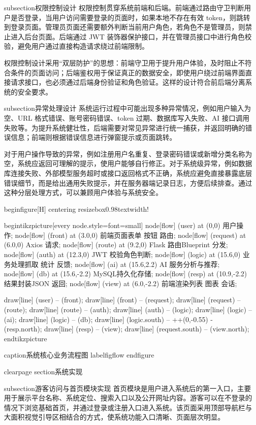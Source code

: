 subsection{权限控制设计}
权限控制贯穿系统前端和后端。前端通过路由守卫判断用户是否登录，当用户访问需要登录的页面时，如果本地不存在有效 token，则跳转到登录页面。管理员页面还需要额外判断当前用户角色，若角色不是管理员，则禁止进入后台页面。后端通过 JWT 装饰器保护接口，并在管理员接口中进行角色校验，避免用户通过直接构造请求绕过前端限制。

权限控制设计采用“双层防护”的思想：前端守卫用于提升用户体验，及时阻止不符合条件的页面访问；后端鉴权用于保证真正的数据安全，即使用户绕过前端界面直接请求接口，也必须通过后端身份验证和角色验证。这样的设计符合前后端分离系统的安全要求。

subsection{异常处理设计}
系统运行过程中可能出现多种异常情况，例如用户输入为空、URL 格式错误、账号密码错误、token 过期、数据库写入失败、AI 接口调用失败等。为提升系统健壮性，后端需要对常见异常进行统一捕获，并返回明确的错误信息；前端则根据错误信息进行弹窗提示或页面跳转。

对于用户操作导致的异常，例如注册用户名重复、登录密码错误或新增分类名称为空，系统应返回可理解的提示，使用户能够自行修正。对于系统级异常，例如数据库连接失败、外部模型服务超时或接口返回格式不正确，系统应避免直接暴露底层错误细节，而是给出通用失败提示，并在服务器端记录日志，方便后续排查。通过这种分层处理方式，可以兼顾用户体验与系统安全。

begin{figure}[H]
centering
resizebox{0.98textwidth}{!}{
begin{tikzpicture}[every node.style={font=small}]
  node[flow] (user) at (0,0) {用户操作};
  node[flow] (front) at (3.0,0) {前端页面表单  按钮  路由};
  node[flow] (request) at (6.0,0) {Axios 请求};
  node[flow] (route) at (9.2,0) {Flask 路由Blueprint 分发};
  node[flow] (auth) at (12.3,0) {JWT 校验角色判断};
  node[flow] (logic) at (15.6,0) {业务处理抓取  统计  反馈};
  node[flow] (ai) at (15.6,2.2) {AI 服务分析与推荐};
  node[flow] (db) at (15.6,-2.2) {MySQL持久化存储};
  node[flow] (resp) at (10.9,-2.2) {结果封装JSON 返回};
  node[flow] (view) at (6.0,-2.2) {前端渲染列表  图表  会话};

  draw[line] (user) -- (front);
  draw[line] (front) -- (request);
  draw[line] (request) -- (route);
  draw[line] (route) -- (auth);
  draw[line] (auth) -- (logic);
  draw[line] (logic) -- (ai);
  draw[line] (logic) -- (db);
  draw[line] (logic.south) -- ++(0,-0.55) - (resp.north);
  draw[line] (resp) -- (view);
  draw[line] (request.south) -- (view.north);
end{tikzpicture}
}
caption{系统核心业务流程图}
label{figflow}
end{figure}

clearpage
section{系统实现}

subsection{游客访问与首页模块实现}
首页模块是用户进入系统后的第一入口，主要用于展示平台名称、系统定位、搜索入口以及公开网址内容。游客可以在不登录的情况下浏览基础首页，并通过登录或注册入口进入系统。该页面采用顶部导航栏与大面积视觉引导区相结合的方式，使系统功能入口清晰、页面层次明显。

